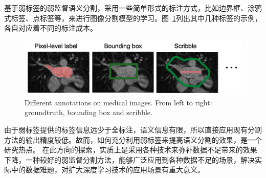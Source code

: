 基于弱标签的弱监督语义分割，采用一些简单形式的标注方式，比如边界框、涂鸦式标签、点标签等，来进行图像分割模型的学习。图~\ref{c1_fig2}列出其中几种标签的示例，各自对应着不同的标注成本。
    \begin{figure}[tbp]
        \centering 
        \includegraphics[width=1.0\textwidth]{img/c1/intro_2.png}
        {Different annotations on medical images. From left to right: groundtruth, bounding box and scribble.}
        \label{c1_fig2}
    \end{figure}
由于弱标签提供的标签信息远少于全标注，语义信息有限，所以直接应用现有分割方法的输出精度较低。故而，如何充分利用弱标签来提高语义分割的效果，是一个研究热点。
在此方向的探索，实质上是采用各种技术来弥补数据不足带来的效果下降，一种较好的弱监督分割方法，能够广泛应用到各种数据不足的场景，解决实际中的数据难题，对扩大深度学习技术的应用场景有重大意义。

